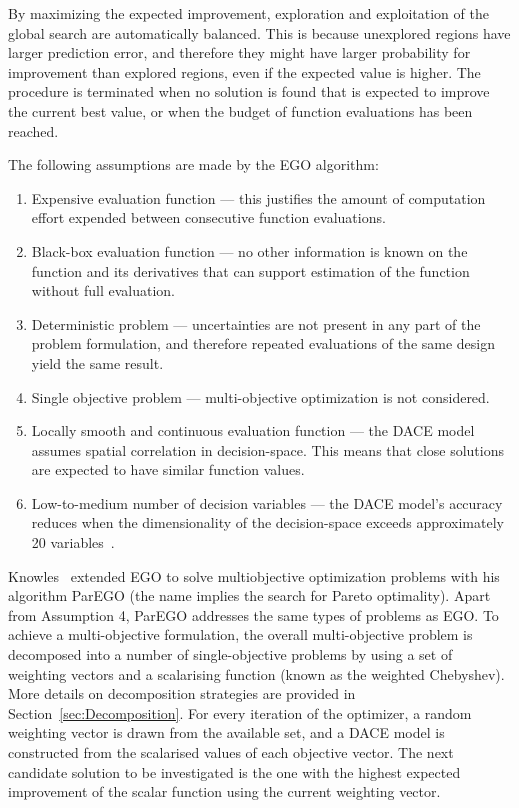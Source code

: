 \documentclass[a4paper]{article}
\begin{document}
By maximizing the expected improvement, exploration and exploitation of the global search are automatically balanced. This is because unexplored regions have larger prediction error, and therefore they might have larger probability for improvement than explored regions, even if the expected value is higher. The procedure is terminated when no solution is found that is expected to improve the current best value, or when the budget of function evaluations has been reached.

The following assumptions are made by the EGO algorithm:
\begin{enumerate}
	\item Expensive evaluation function --- this justifies the amount of computation effort expended between consecutive function evaluations.
	\item Black-box evaluation function --- no other information is known on the function and its derivatives that can support estimation of the function without full evaluation.
	\item Deterministic problem --- uncertainties are not present in any part of the problem formulation, and therefore repeated evaluations of the same design yield the same result.
	\item Single objective problem --- multi-objective optimization is not considered.
	\item Locally smooth and continuous evaluation function --- the DACE model assumes spatial correlation in decision-space.
This means that close solutions are expected to have similar function values.
	\item Low-to-medium number of decision variables --- the DACE model's accuracy reduces when the dimensionality of the decision-space exceeds approximately 20 variables~\cite{Knowles2006ParEGO}.
\end{enumerate}

Knowles~\cite{Knowles2006ParEGO} extended EGO to solve multiobjective optimization problems with his algorithm ParEGO (the name implies the search for Pareto optimality). Apart from Assumption 4, ParEGO addresses the same types of problems as EGO. To achieve a multi-objective formulation, the overall multi-objective problem is decomposed into a number of single-objective problems by using a set of weighting vectors and a scalarising function (known as the weighted Chebyshev). More details on decomposition strategies are provided in Section~\ref{sec:Decomposition}. For every iteration of the optimizer, a random weighting vector is drawn from the available set, and a DACE model is constructed from the scalarised values of each objective vector. The next candidate solution to be investigated is the one with the highest expected improvement of the scalar function using the current weighting vector.
\end{document}
